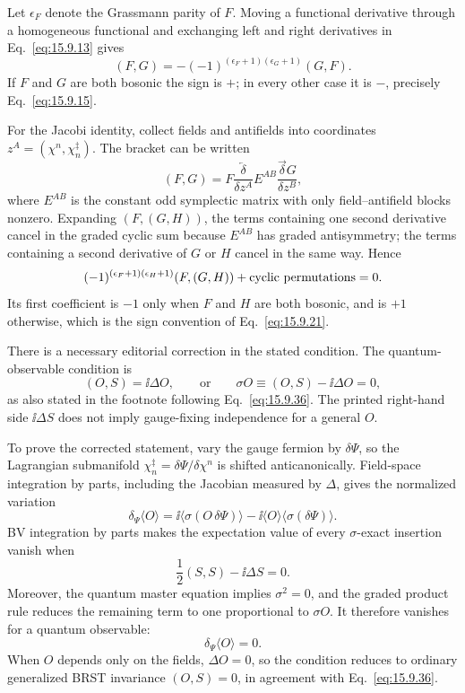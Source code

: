 \begin{enumerate}
  Let \(\epsilon_F\) denote the Grassmann parity of \(F\).  Moving a
  functional derivative through a homogeneous functional and exchanging
  left and right derivatives in Eq.~\eqref{eq:15.9.13} gives
  \[
    (F,G)
      =-(-1)^{(\epsilon_F+1)(\epsilon_G+1)}(G,F).
  \]
  If \(F\) and \(G\) are both bosonic the sign is \(+\); in every other
  case it is \(-\), precisely Eq.~\eqref{eq:15.9.15}.

  For the Jacobi identity, collect fields and antifields into coordinates
  \(z^A=(\chi^n,\chi_n^\ddagger)\).  The bracket can be written
  \[
    (F,G)=F\frac{\overleftarrow\delta}{\delta z^A}
      E^{AB}\frac{\overrightarrow\delta G}{\delta z^B},
  \]
  where \(E^{AB}\) is the constant odd symplectic matrix with only
  field--antifield blocks nonzero.  Expanding
  \((F,(G,H))\), the terms containing one second derivative cancel in the
  graded cyclic sum because \(E^{AB}\) has graded antisymmetry; the terms
  containing a second derivative of \(G\) or \(H\) cancel in the same way.
  Hence
  \[
    (-1)^{(\epsilon_F+1)(\epsilon_H+1)}(F,(G,H))
      +\hbox{cyclic permutations}=0.
  \]
  Its first coefficient is \(-1\) only when \(F\) and \(H\) are both
  bosonic, and is \(+1\) otherwise, which is the sign convention of
  Eq.~\eqref{eq:15.9.21}.

  There is a necessary editorial correction in the stated condition.  The
  quantum-observable condition is
  \[
    (O,S)=\ii\Delta O,
    \qquad\text{or}\qquad
    \sigma O\equiv(O,S)-\ii\Delta O=0,
  \]
  as also stated in the footnote following
  Eq.~\eqref{eq:15.9.36}.  The printed right-hand side \(\ii\Delta S\) does
  not imply gauge-fixing independence for a general \(O\).

  To prove the corrected statement, vary the gauge fermion by
  \(\delta\Psi\), so the Lagrangian submanifold
  \(\chi_n^\ddagger=\delta\Psi/\delta\chi^n\) is shifted
  anticanonically.  Field-space integration by parts, including the
  Jacobian measured by \(\Delta\), gives the normalized variation
  \[
    \delta_\Psi\langle O\rangle
      =\ii\bigl\langle \sigma(O\,\delta\Psi)\bigr\rangle
       -\ii\langle O\rangle\bigl\langle\sigma(\delta\Psi)\bigr\rangle .
  \]
  BV integration by parts makes the expectation value of every
  \(\sigma\)-exact insertion vanish when
  \[
    \frac12(S,S)-\ii\Delta S=0.
  \]
  Moreover, the quantum master equation implies \(\sigma^2=0\), and the
  graded product rule reduces the remaining term to one proportional to
  \(\sigma O\).  It therefore vanishes for a quantum observable:
  \[
    \delta_\Psi\langle O\rangle=0.
  \]
  When \(O\) depends only on the fields, \(\Delta O=0\), so the condition
  reduces to ordinary generalized BRST invariance \((O,S)=0\), in agreement
  with Eq.~\eqref{eq:15.9.36}.
\end{enumerate}
